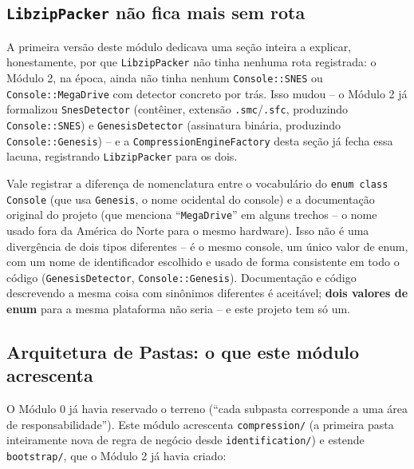 \subsection{\texttt{LibzipPacker} não fica mais sem rota}

A primeira versão deste módulo dedicava uma seção inteira a explicar, honestamente, por que \texttt{LibzipPacker} não tinha nenhuma rota registrada: o Módulo 2, na época, ainda não tinha nenhum \texttt{Console::SNES} ou \texttt{Console::MegaDrive} com detector concreto por trás. Isso mudou -- o Módulo 2 já formalizou \texttt{SnesDetector} (contêiner, extensão \texttt{.smc}/\texttt{.sfc}, produzindo \texttt{Console::SNES}) e \texttt{GenesisDetector} (assinatura binária, produzindo \texttt{Console::Genesis}) -- e a \texttt{CompressionEngineFactory} desta seção já fecha essa lacuna, registrando \texttt{LibzipPacker} para os dois.

\begin{CaixaAlerta}
Vale registrar a diferença de nomenclatura entre o vocabulário do \texttt{enum class Console} (que usa \texttt{Genesis}, o nome ocidental do console) e a documentação original do projeto (que menciona ``\texttt{MegaDrive}'' em alguns trechos -- o nome usado fora da América do Norte para o mesmo hardware). Isso não é uma divergência de dois tipos diferentes -- é o mesmo console, um único valor de enum, com um nome de identificador escolhido e usado de forma consistente em todo o código (\texttt{GenesisDetector}, \texttt{Console::Genesis}). Documentação e código descrevendo a mesma coisa com sinônimos diferentes é aceitável; \textbf{dois valores de enum} para a mesma plataforma não seria -- e este projeto tem só um.
\end{CaixaAlerta}

\subsection{Arquitetura de Pastas: o que este módulo acrescenta}

O Módulo 0 já havia reservado o terreno (``cada subpasta corresponde a uma área de responsabilidade''). Este módulo acrescenta \texttt{compression/} (a primeira pasta inteiramente nova de regra de negócio desde \texttt{identification/}) e estende \texttt{bootstrap/}, que o Módulo 2 já havia criado:

